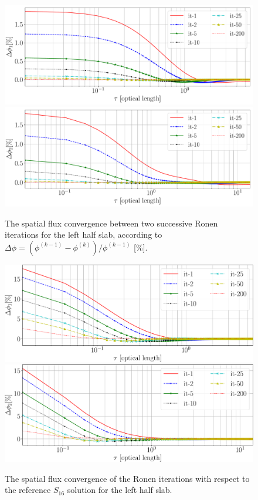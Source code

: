 \begin{figure}[htbp]
	\centering
	\includegraphics[width=0.65\linewidth]{fast_flx_err_RM.pdf}
	\includegraphics[width=0.65\linewidth]{thermal_flx_err_RM.pdf}	%
	\caption{The spatial flux convergence between two successive Ronen iterations for the left half slab, according to $\Delta\phi = (\phi^{(k-1)}-\phi^{(k)})/\phi^{(k-1)}$ [\%].}
	\label{fig:conv2}
\end{figure}

\begin{figure}[hbtp]
	\centering
	\includegraphics[width=0.65\linewidth]{RM_Sn_converg_FAST.pdf}
	\includegraphics[width=0.65\linewidth]{RM_Sn_converg_THERMAL.pdf}
	\caption{The spatial flux convergence of the Ronen iterations with respect to the reference $S_{16}$ solution for the left half slab.}
	\label{fig:conv3}
\end{figure}

